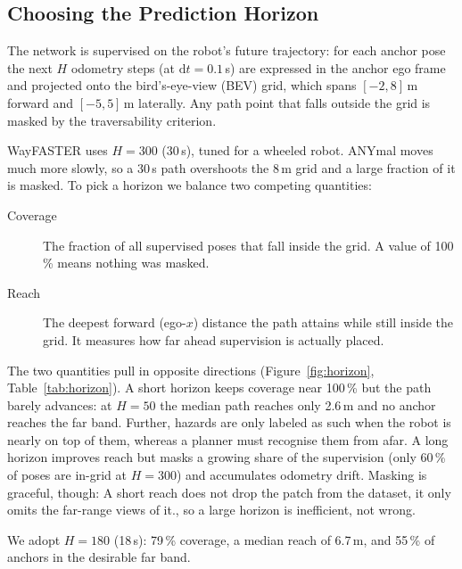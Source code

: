 

\subsection{Choosing the Prediction Horizon}
\label{sec:horizon}

The network is supervised on the robot's future trajectory: for each anchor
pose the next $H$ odometry steps (at $\mathrm{d}t = 0.1\,$s) are expressed
in the anchor ego frame and projected onto the bird's-eye-view (BEV) grid, which
spans $[-2, 8]\,$m forward and $[-5, 5]\,$m laterally. Any path point that falls
outside the grid is masked by the traversability criterion.

WayFASTER uses $H = 300$ (30\,s), tuned for a wheeled robot. ANYmal moves much
more slowly, so a 30\,s path overshoots the 8\,m grid and a large fraction of it
is masked. To pick a horizon we balance two competing quantities:

\begin{description}
  \item[Coverage] The fraction of all supervised poses that fall inside the grid.
        A value of 100\,\% means nothing was masked.
  \item[Reach] The deepest forward (ego-$x$) distance the path attains
        while still inside the grid. It measures how far ahead supervision is
        actually placed.
\end{description}


The two quantities pull in opposite directions (Figure~\ref{fig:horizon},
Table~\ref{tab:horizon}). A short horizon keeps coverage near 100\,\% but the path
barely advances: at $H = 50$ the median path reaches only 2.6\,m and no anchor
reaches the far band.
Further, hazards are only labeled as such when the robot is nearly on top of them, whereas a planner must recognise them from afar.
A long
horizon improves reach but masks a growing share of the supervision (only 60\,\%
of poses are in-grid at $H = 300$) and accumulates odometry drift.
Masking is graceful, though: A short reach does not drop the patch from the dataset, it only omits the far-range views of it., so a large horizon is inefficient, not wrong.

We adopt $H = 180$ (18\,s): 79\,\% coverage, a median reach of 6.7\,m, and 55\,\%
of anchors in the desirable far band.

